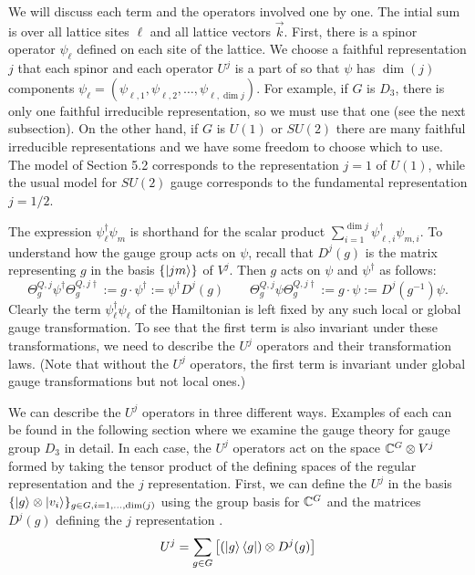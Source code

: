 \documentclass[11pt,reqno]{amsart}
\numberwithin{equation}{section}
\begin{document}
	We will discuss each term and the operators involved one by one.
	The intial sum is over all lattice sites $\ell$ and all lattice vectors $\vec{k}$.
	First, there is a spinor operator $\psi_\ell$ defined on each site of the lattice.
	We choose a faithful representation $j$ that each spinor and each operator $U^j$ is a part of so that $\psi$ has $\dim(j)$ components $\psi_\ell=(\psi_{\ell,1},\psi_{\ell,2},\ldots,\psi_{\ell,\dim j})$.
	For example, if $G$ is $D_3$, there is only one faithful irreducible representation, so we must use that one (see the next subsection).
	On the other hand, if $G$ is $U(1)$ or $SU(2)$ there are many faithful irreducible representations and we have some freedom to choose which to use.
	The model of Section 5.2 corresponds to the representation $j=1$ of $U(1)$, while the usual model for $SU(2)$ gauge corresponds to the fundamental representation $j=1/2$.
	
	The expression $\psi_\ell^\dagger\psi_m$ is shorthand for the scalar product $\sum_{i=1}^{\dim j} \psi^\dagger_{\ell,i} \psi_{m,i}$.
	To understand how the gauge group acts on $\psi$, recall that $D^j(g)$ is the matrix representing $g$ in the basis $\{\ket{jm}\}$ of $V^j$.
	Then $g$ acts on $\psi$ and $\psi^\dagger$ as follows:
	\begin{equation}
		\Theta_g^{Q,j} \psi^\dagger \Theta_g^{Q,j \dagger} := g \cdot \psi^\dagger := \psi^\dagger D^j(g) \qquad \Theta_g^{Q,j} \psi \Theta_g^{Q,j \dagger} := g\cdot \psi := D^j(g^{-1}) \psi.
	\end{equation}
	Clearly the term $\psi_\ell^\dagger\psi_\ell$ of the Hamiltonian is left fixed by any such local or global gauge transformation.
	To see that the first term is also invariant under these transformations, we need to describe the $U^j$ operators and their transformation laws.
	(Note that without the $U^j$ operators, the first term is invariant under global gauge transformations but not local ones.)
	
	We can describe the $U^j$ operators in three different ways.
	Examples of each can be found in the following section where we examine the gauge theory for gauge group $D_3$ in detail.
	In each case, the $U^j$ operators act on the space $\mathbb{C}^G \otimes V^j$ formed by taking the tensor product of the defining spaces of the regular representation and the $j$ representation.
	First, we can define the $U^j$ in the basis $\{\ket{g}\otimes\ket{v_i} \}_{g\in G, i=1,\ldots,\dim(j)}$ using the group basis for $\mathbb{C}^G$ and the matrices $D^j(g)$ defining the $j$ representation \cite{TCL14}. 
	\begin{equation}
		U^j=\sum_{g \in G} \left[(\ket{g}\bra{g}) \otimes D^j(g) \right]
	\end{equation}
	
\end{document}
